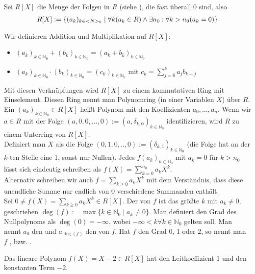 \begin{definition}[Polynom]
	Sei $R[X]$ die Menge der Folgen in $R$ (siehe ), die fast überall 0 sind, also
	\begin{align}
		R[X]:=\{(a_k)_{k \in \mathbb N_0} \mid \forall k(a_k \in R) \land \exists n_0: \forall k>n_0(a_k=0)\} \notag
	\end{align}
\end{definition}
Wir definieren Addition und Multiplikation auf $R[X]$:
\begin{itemize}
	\item $(a_k)_{k \in \mathbb N_0}+(b_k)_{k \in \mathbb N_0}=(a_k+b_k)_{k \in \mathbb N_0}$
	\item $(a_k)_{k \in \mathbb N_0}\cdot (b_k)_{k \in \mathbb N_0}=(c_k)_{k \in \mathbb N_0}$ mit 
	$c_k = \sum _{j=0}^{k} a_jb_{k-j}$
\end{itemize}
Mit diesen Verknüpfungen wird $R[X]$ zu einem kommutativen Ring mit Einselement. Diesen Ring nennt man
Polynomring (in einer Variablen $X$) über $R$. Ein $(a_k)_{k \in \mathbb N_0} \in R[X]$ heißt Polynom mit
den Koeffizienten $a_0,...,a_n$. Wenn wir $a \in R$ mit der Folge $(a,0,0,...,0) := (a,\delta_{k,0})_{k \in \mathbb N_0}$
identifizieren, wird $R$ zu einem Unterring von $R[X]$. \\
Definiert man $X$ als die Folge $(0,1,0,..,0) := (\delta_{k,1})_{k \in \mathbb N_0}$ (die Folge hat an der $k$-ten 
Stelle eine 1, sonst nur Nullen). Jedes $f(a_k)_{k \in \mathbb N_0}$ mit $a_k=0$ für $k>n_0$ lässt sich eindeutig
schreiben als $f(X)=\sum_{k=0}^{n_0} a_kX^k$.\\
Alternativ schreiben wir auch $f=\sum_{k \ge 0} a_kX^k$ mit dem Verständnis, dass diese unendliche
Summe nur endlich von 0 verschiedene Summanden enthält.\\
Sei $0 \neq f(X)=\sum_{k \ge 0} a_kX^k \in R[X]$. Der  von $f$ ist das größte $k$ mit $a_k
\neq 0$, geschrieben $\deg(f):= \max\{k \in \mathbb N_0 \mid a_k \neq 0\}$. Man definiert den Grad des
Nullpolynoms als $\deg(0)=-\infty$, wobei $-\infty < k \forall k \in \mathbb N_0$ gelten soll. Man nennt $a_0$
den  und $a_{\deg(f)}$ den  von $f$. Hat $f$ den Grad 0, 1 oder 2, so nennt
man $f$ ,  bzw. .
\begin{example}
	Das lineare Polynom $f(X)=X-2 \in R[X]$ hat den Leitkoeffizient 1 und den konstanten Term $-2$.
\end{example}

